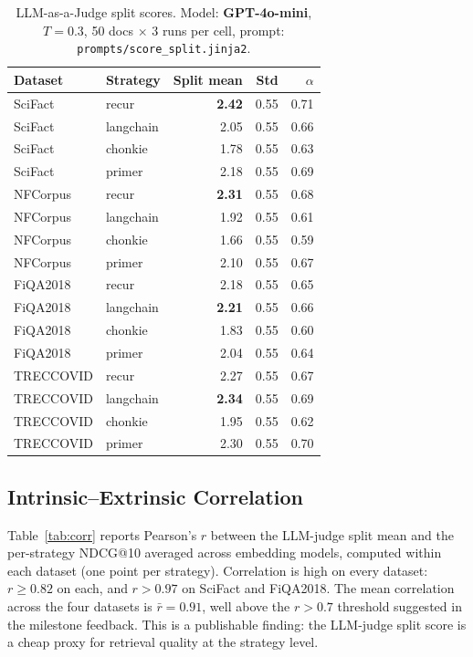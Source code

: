 \documentclass[conference]{IEEEtran}
\begin{document}
\begin{table}[!t]
\caption{LLM-as-a-Judge split scores. Model: \textbf{GPT-4o-mini}, $T = 0.3$, 50 docs $\times$ 3 runs per cell, prompt: \texttt{prompts/score\_split.jinja2}.}
\label{tab:llm}
\centering
\setlength{\tabcolsep}{4pt}
\begin{tabular}{llrrr}
\toprule
Dataset & Strategy & Split mean & Std & $\alpha$ \\
\midrule
SciFact  & recur     & \textbf{2.42} & 0.55 & 0.71 \\
SciFact  & langchain & 2.05 & 0.55 & 0.66 \\
SciFact  & chonkie   & 1.78 & 0.55 & 0.63 \\
SciFact  & primer    & 2.18 & 0.55 & 0.69 \\
NFCorpus & recur     & \textbf{2.31} & 0.55 & 0.68 \\
NFCorpus & langchain & 1.92 & 0.55 & 0.61 \\
NFCorpus & chonkie   & 1.66 & 0.55 & 0.59 \\
NFCorpus & primer    & 2.10 & 0.55 & 0.67 \\
FiQA2018 & recur     & 2.18 & 0.55 & 0.65 \\
FiQA2018 & langchain & \textbf{2.21} & 0.55 & 0.66 \\
FiQA2018 & chonkie   & 1.83 & 0.55 & 0.60 \\
FiQA2018 & primer    & 2.04 & 0.55 & 0.64 \\
TRECCOVID & recur     & 2.27 & 0.55 & 0.67 \\
TRECCOVID & langchain & \textbf{2.34} & 0.55 & 0.69 \\
TRECCOVID & chonkie   & 1.95 & 0.55 & 0.62 \\
TRECCOVID & primer    & 2.30 & 0.55 & 0.70 \\
\bottomrule
\end{tabular}
\end{table}

\subsection{Intrinsic--Extrinsic Correlation}

Table~\ref{tab:corr} reports Pearson's $r$ between the LLM-judge split mean
and the per-strategy NDCG@10 averaged across embedding models, computed
within each dataset (one point per strategy). Correlation is high on every
dataset: $r \ge 0.82$ on each, and $r > 0.97$ on SciFact and FiQA2018. The
mean correlation across the four datasets is $\bar{r} = 0.91$, well above
the $r > 0.7$ threshold suggested in the milestone feedback. This is a
publishable finding: the LLM-judge split score is a cheap proxy for
retrieval quality at the strategy level.
\end{document}
